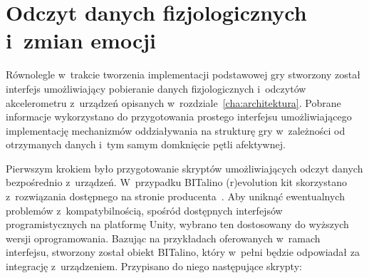 \section{Odczyt danych fizjologicznych i~zmian emocji}
Równolegle w~trakcie tworzenia implementacji podstawowej gry stworzony został interfejs umożliwiający pobieranie danych fizjologicznych i~odczytów akcelerometru z~urządzeń opisanych w~rozdziale~\ref{cha:architektura}. Pobrane informacje wykorzystano do przygotowania prostego interfejsu umożliwiającego implementację mechanizmów oddziaływania na strukturę gry w~zależności od otrzymanych danych i~tym samym domknięcie pętli afektywnej.

Pierwszym krokiem było przygotowanie skryptów umożliwiających odczyt danych bezpośrednio z~urządzeń. W~przypadku BITalino (r)evolution kit skorzystano z~rozwiązania dostępnego na stronie producenta~\cite{bitalino_apis}. Aby uniknąć ewentualnych problemów z~kompatybilnością, spośród dostępnych interfejsów programistycznych na platformę Unity, wybrano ten dostosowany do wyższych wersji oprogramowania. Bazując na przykładach oferowanych w~ramach interfejsu, stworzony został obiekt BITalino, który w~pełni będzie odpowiadał za integrację z~urządzeniem. Przypisano do niego następujące skrypty:
